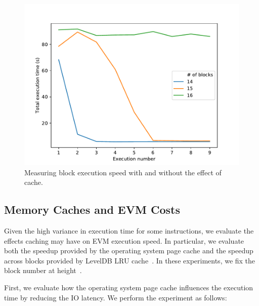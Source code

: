 \begin{figure}[tb]
	\includegraphics[width=\columnwidth]{3-vm-security/figures/cache-persistence.pdf}
	\caption{Measuring block execution speed with and without the effect of cache.}
	\label{fig:cache-persistence}
\end{figure}

\subsection{Memory Caches and EVM Costs}
\label{ssec:memory-caches}
Given the high variance in execution time for some instructions, we evaluate the effects caching may have on EVM execution speed. In particular, we evaluate both the speedup provided by the operating system page cache and the speedup across blocks provided by LevelDB LRU cache~\cite{leveldb-cache}. In these experiments, we fix the block number at height~.

 First, we evaluate how the operating system page cache influences the execution time by reducing the IO latency. We perform the experiment as follows:

